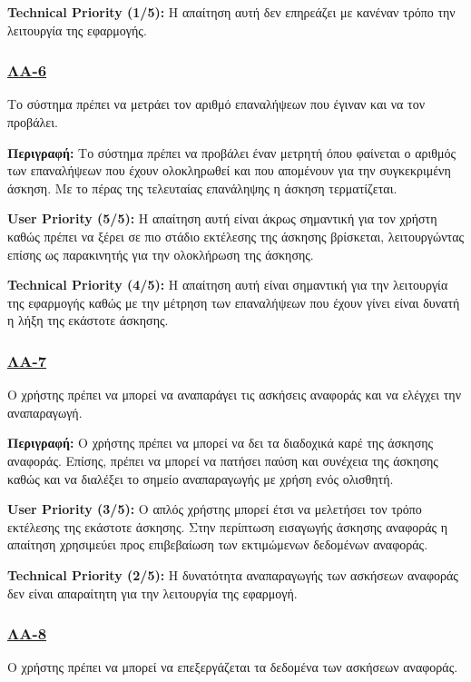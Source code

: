 \noindent\textbf{Technical Priority (1/5):} Η απαίτηση αυτή δεν επηρεάζει με κανέναν τρόπο την λειτουργία της εφαρμογής.

\subsubsection{\underline{ΛΑ-6}}
\noindent Το σύστημα πρέπει να μετράει τον αριθμό επαναλήψεων που έγιναν και να τον προβάλει.

\noindent\textbf{Περιγραφή:} Το σύστημα πρέπει να προβάλει έναν μετρητή όπου φαίνεται ο αριθμός των επαναλήψεων που έχουν ολοκληρωθεί και που απομένουν για την συγκεκριμένη άσκηση. Με το πέρας της τελευταίας επανάληψης η άσκηση τερματίζεται.

\noindent\textbf{User Priority (5/5):} Η απαίτηση αυτή είναι άκρως σημαντική για τον χρήστη καθώς πρέπει να ξέρει σε πιο στάδιο εκτέλεσης της άσκησης βρίσκεται, λειτουργώντας επίσης ως παρακινητής για την ολοκλήρωση της άσκησης. 

\noindent\textbf{Technical Priority (4/5):} Η απαίτηση αυτή είναι σημαντική για την λειτουργία της εφαρμογής καθώς με την μέτρηση των επαναλήψεων που έχουν γίνει είναι δυνατή η λήξη της εκάστοτε άσκησης.

\subsubsection{\underline{ΛΑ-7}}
\noindent Ο χρήστης πρέπει να μπορεί να αναπαράγει τις ασκήσεις αναφοράς και να ελέγχει την αναπαραγωγή.

\noindent\textbf{Περιγραφή:} Ο χρήστης πρέπει να μπορεί να δει τα διαδοχικά καρέ της άσκησης αναφοράς. Επίσης, πρέπει να μπορεί να πατήσει παύση και συνέχεια της άσκησης καθώς και να διαλέξει το σημείο αναπαραγωγής με χρήση ενός ολισθητή.

\noindent\textbf{User Priority (3/5):} Ο απλός χρήστης μπορεί έτσι να μελετήσει τον τρόπο εκτέλεσης της εκάστοτε άσκησης. Στην περίπτωση εισαγωγής άσκησης αναφοράς η απαίτηση χρησιμεύει προς επιβεβαίωση των εκτιμώμενων δεδομένων αναφοράς.

\noindent\textbf{Technical Priority (2/5):} Η δυνατότητα αναπαραγωγής των ασκήσεων αναφοράς δεν είναι απαραίτητη για την λειτουργία της εφαρμογή.

\subsubsection{\underline{ΛΑ-8}}
\noindent Ο χρήστης πρέπει να μπορεί να επεξεργάζεται τα δεδομένα των ασκήσεων αναφοράς.

